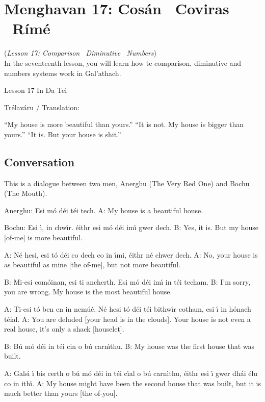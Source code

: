 \section{Menghavan 17: Cos\'{a}n \textendash\ Coviras \textendash\ R\'{i}m\'{e}}
(\textit{Lesson 17: Comparison \textendash\ Diminutive \textendash\ Numbers})\\

In the seventeenth lesson, you will learn how te comparison, diminutive and numbers systems work in Gal'{a}thach. 

Lesson 17 In Da Tei

Tr\'{e}lav\'{a}ru / Translation:

``My house is more beautiful than yours.''
``It is not. My house is bigger than yours.''
``It is. But your house is shit.''

\subsection{Conversation}

This is a dialogue between two men, Anerghu (The Very Red One) and Bochu (The Mouth).

Anerghu: Esi m\'{o} d\'{e}i t\'{e}i tech.
A: My house is a beautiful house.

Bochu: Esi \'{\i}, in chw\'{\i}r. \'{e}ithr esi m\'{o} d\'{e}i im\'{\i} gwer dech.
B: Yes, it is. But my house [of-me] is more beautiful.

A: N\'{e} hesi, esi t\'{o} d\'{e}i co dech co in \'{\i}mi, \'{e}ithr n\'{e} chwer dech.
A: No, your house is as beautiful as mine [the of-me], but not more beautiful.

B: Mi-esi com\'{o}inan, esi ti ancherth. Esi m\'{o} d\'{e}i im\'{\i} in t\'{e}i techam.
B: I'm sorry, you are wrong. My house is the most beautiful house.

A: Ti-esi t\'{o} ben en in nem\'{u}\'{e}. N\'{e} hesi t\'{o} d\'{e}i t\'{e}i bithw\'{\i}r cotham, esi \'{\i} in h\'{o}nach t\'{e}ial.
A: You are deluded [your head is in the clouds]. Your house is not even a real house, it's only a shack [houselet].

B: B\'{u} m\'{o} d\'{e}i in t\'{e}i cin o b\'{u} carn\'{\i}thu.
B: My house was the first house that was built.

A: Gals\'{\i} \'{\i} bis certh o b\'{u} m\'{o} d\'{e}i in t\'{e}i c\'{\i}al o b\'{u} carn\'{\i}thu, \'{e}ithr esi \'{\i} gwer dh\'{a}i \'{e}lu co in ith\'{\i}.
A: My house might have been the second house that was built, but it is much better than yours [the of-you].

